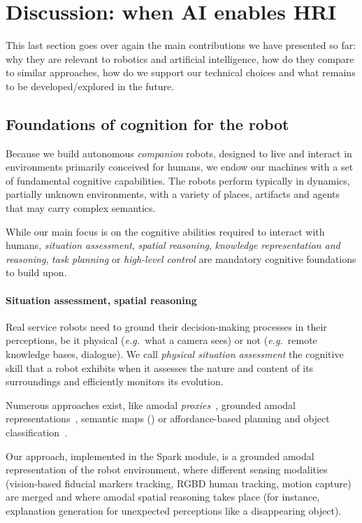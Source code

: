 \documentclass[preprint,3p,times]{elsarticle}
\newcommand{\eg}{{\textit{e.g.\ }}}
\begin{document}
\section{Discussion: when AI enables HRI}
\label{sect|conclusion}

This last section goes over again the main contributions we have presented
so far: why they are relevant to robotics and artificial intelligence, how do
they compare to similar approaches, how do we support our technical choices and
what remains to be developed/explored in the future.

\subsection{Foundations of cognition for the robot}

Because we build autonomous \emph{companion} robots, designed to live and
interact in environments primarily conceived for humans, we endow our machines
with a set of fundamental cognitive capabilities. The robots perform typically
in dynamics, partially unknown environments, with a variety of places,
artifacts and agents that may carry complex semantics.

While our main focus is on the cognitive abilities required to interact with
humans, \emph{situation assessment}, \emph{spatial reasoning}, \emph{knowledge
representation and reasoning}, \emph{task planning} or \emph{high-level
control} are mandatory cognitive foundations to build upon.

\paragraph{Situation assessment, spatial reasoning}

Real service robots need to ground their decision-making processes in their
perceptions, be it physical (\eg what a camera sees) or not (\eg remote
knowledge bases, dialogue). We call \emph{physical situation assessment} the
cognitive skill that a robot exhibits when it assesses the nature and content of its
surroundings and efficiently monitors its evolution.

Numerous approaches exist, like amodal \emph{proxies}~\cite{Jacobsson2008},
grounded amodal representations~\cite{Mavridis2006}, semantic maps
(\cite{Nuechter2008, Galindo2008,Blodow2011}) or
affordance-based planning and object classification~\cite{Lorken2008,
Varadarajan2011}.

Our approach, implemented in the {\sc Spark} module, is a grounded amodal
representation of the robot environment, where different sensing modalities
(vision-based fiducial markers tracking, RGBD human tracking, motion capture)
are merged and where amodal spatial reasoning takes place (for instance,
explanation generation for unexpected perceptions like a disappearing object).
\end{document}
